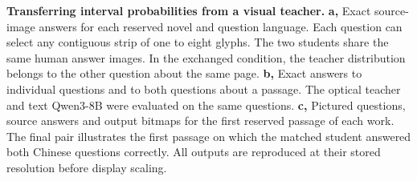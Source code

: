 \textbf{Transferring interval probabilities from a visual teacher.}
\textbf{a,} Exact source-image answers for each reserved novel and question language. Each question can select any contiguous strip of one to eight glyphs. The two students share the same human answer images. In the exchanged condition, the teacher distribution belongs to the other question about the same page. \textbf{b,} Exact answers to individual questions and to both questions about a passage. The optical teacher and text Qwen3-8B were evaluated on the same questions. \textbf{c,} Pictured questions, source answers and output bitmaps for the first reserved passage of each work. The final pair illustrates the first passage on which the matched student answered both Chinese questions correctly. All outputs are reproduced at their stored resolution before display scaling.
